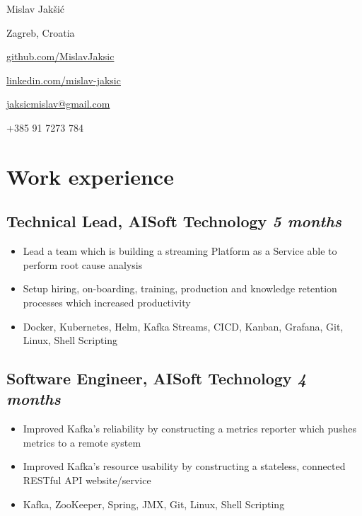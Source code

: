 \documentclass[a4paper]{article}
\newcommand{\bolditalicpair}
[2]
{\textbf{#1} \texorpdfstring{\hfill}{} \textit{#2}}
\begin{document}
\begin{multicols}{2}

\noindent
\begin{minipage}{.49\textwidth}
\raggedright

{\huge Mislav Jakšić}

Zagreb, Croatia
\end{minipage}

\noindent
\begin{minipage}{.49\textwidth}
\raggedleft

\href{https://github.com/MislavJaksic}{github.com/MislavJaksic}

\href{https://www.linkedin.com/in/mislav-jaksic}{linkedin.com/mislav-jaksic}

\href{mailto:jaksicmislav@gmail.com}{jaksicmislav@gmail.com}

+385 91 7273 784

\end{minipage}

\end{multicols}



\section{Work experience}
\subsection{\bolditalicpair{Technical Lead, AISoft Technology}{5 months}}

\begin{itemize}
  \item Lead a team which is building a streaming Platform as a Service able to perform root cause analysis
  \item Setup hiring, on-boarding, training, production and knowledge retention processes which increased productivity
  \item Docker, Kubernetes, Helm, Kafka Streams, CICD, Kanban, Grafana, Git, Linux, Shell Scripting
\end{itemize}

\subsection{\bolditalicpair{Software Engineer, AISoft Technology}{4 months}}

\begin{itemize}
  \item Improved Kafka's reliability by constructing a metrics reporter which pushes metrics to a remote system
  \item Improved Kafka's resource usability by constructing a stateless, connected RESTful API website/service
  \item Kafka, ZooKeeper, Spring, JMX, Git, Linux, Shell Scripting
\end{itemize}
\end{document}
